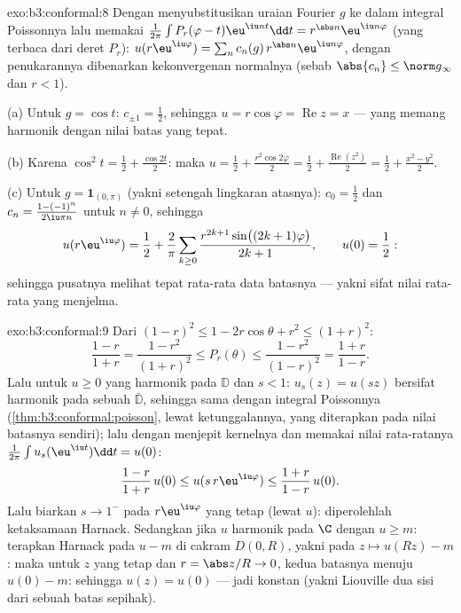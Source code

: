 \begin{solution}{exo:b3:conformal:8}
Dengan menyubstitusikan uraian Fourier $g$ ke dalam integral
Poissonnya lalu memakai
$\frac1{2\pi}\int P_r(\varphi - t)\eu^{\iu nt}\dd t =
r^{\abs n}\eu^{\iu n\varphi}$ (yang terbaca dari deret $P_r$):
$u(r\eu^{\iu\varphi}) = \sum_nc_n(g)\,r^{\abs
n}\eu^{\iu n\varphi}$, dengan penukarannya dibenarkan kekonvergenan
normalnya (sebab $\abs{c_n} \leq \norm g_\infty$ dan $r < 1$).

(a) Untuk $g = \cos t$: $c_{\pm1} = \frac12$, sehingga $u =
r\cos\varphi = \operatorname{Re}z = x$ --- yang memang harmonik
dengan nilai batas yang tepat.

(b) Karena $\cos^2t = \frac12 + \frac{\cos 2t}2$: maka $u = \frac12 +
\frac{r^2\cos2\varphi}2 = \frac12 +
\frac{\operatorname{Re}(z^2)}2 = \frac12 + \frac{x^2 -
y^2}{2}$.

(c) Untuk $g = \mathbf 1_{(0,\pi)}$ (yakni setengah lingkaran atasnya): $c_0 =
\frac12$ dan $c_n = \frac{1 - (-1)^n}{2\iu\pi n}$ untuk $n \neq
0$, sehingga
\[
u(r\eu^{\iu\varphi}) = \frac12 + \frac2\pi\sum_{k\geq0}
\frac{r^{2k+1}\sin\bigl((2k+1)\varphi\bigr)}{2k + 1},
\qquad u(0) = \frac12 :
\]
sehingga pusatnya melihat tepat rata-rata data batasnya ---
yakni sifat nilai rata-rata yang menjelma.
\end{solution}

\begin{solution}{exo:b3:conformal:9}
Dari $(1-r)^2 \leq 1 - 2r\cos\theta + r^2 \leq (1+r)^2$:
\[
\frac{1-r}{1+r} = \frac{1 - r^2}{(1+r)^2} \leq P_r(\theta)
\leq \frac{1 - r^2}{(1 - r)^2} = \frac{1+r}{1-r} .
\]
Lalu untuk $u \geq 0$ yang harmonik pada $\mathbb D$ dan $s < 1$: $u_s(z) =
u(sz)$ bersifat harmonik pada sebuah  $\bar{\mathbb D}$,
sehingga sama dengan integral Poissonnya
(\cref{thm:b3:conformal:poisson}, lewat ketunggalannya, yang diterapkan pada
nilai batasnya sendiri); lalu dengan menjepit kernelnya dan memakai
nilai rata-ratanya $\frac1{2\pi}\int u_s(\eu^{\iu t})\dd t = u(0)$:
\[
\frac{1-r}{1+r}\,u(0) \leq u(s\,r\eu^{\iu\varphi}) \leq
\frac{1+r}{1-r}\,u(0).
\]
Lalu biarkan $s \to 1^-$ pada $r\eu^{\iu\varphi}$ yang tetap (lewat 
$u$): diperolehlah ketaksamaan Harnack. Sedangkan jika $u$ harmonik pada $\C$
dengan $u \geq m$: terapkan Harnack pada $u - m$ di cakram $D(0, R)$,
yakni pada $z \mapsto u(Rz) - m$: maka untuk $z$ yang tetap dan $r =
\abs z/R \to 0$, kedua batasnya menuju $u(0) - m$: sehingga $u(z) =
u(0)$ --- jadi konstan (yakni Liouville dua sisi dari sebuah batas
sepihak).
\end{solution}

